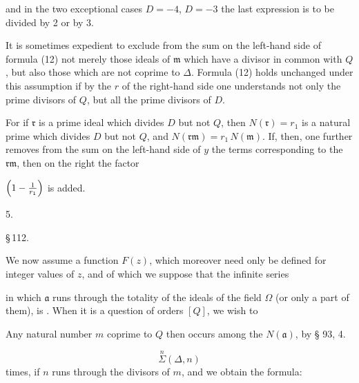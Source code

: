 
and in the two exceptional cases $D=-4$, $D=-3$ the last
expression is to be divided by 2 or by 3.


It is sometimes expedient to exclude from the sum on the left-hand
side of formula (12) not merely those ideals of $\mathfrak{m}$
which have a divisor in common with $Q$, but also those which are
not coprime to $\varDelta$. Formula (12) holds unchanged under
this assumption if by the $r$ of the right-hand side one
understands not only the prime divisors of $Q$, but all the prime
divisors of $D$.

For if $\mathfrak{r}$ is a prime ideal which divides $D$ but not
$Q$, then $N(\mathfrak{r}) = r_1$ is a natural prime which divides
$D$ but not $Q$, and $N(\mathfrak{r}\mathfrak{m}) = r_1\,N(\mathfrak{m})$. If, then,
one further removes from the sum on the left-hand side of $y$ the %
terms corresponding to the $\mathfrak{r}\mathfrak{m}$, then on the
right the factor

$\Bigl(1 - \frac{1}{r_1}\Bigr)$ is added.

5. 

\begin{center}
\S\,112. 
\end{center}

We now assume a function $F(z)$, which moreover need only be
defined for integer values of $z$, and of which we suppose that
the infinite series

in which $\mathfrak{a}$ runs through the totality of the ideals of
the field $\Omega$ (or only a part of them), is . When it is a question of orders $[Q]$, we wish to

Any natural number $m$ coprime to $Q$ then occurs among the
$N(\mathfrak{a})$, by § 93, 4.

\[ \overset{n}{\Sigma} (\varDelta, n) \]
times, if $n$ runs through the divisors of $m$, and we obtain
the formula:

